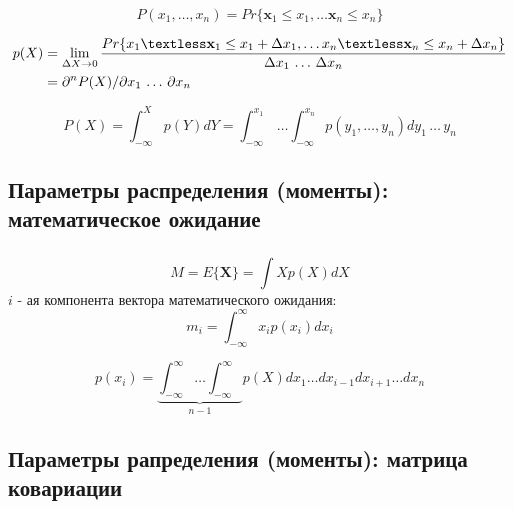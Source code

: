 \documentclass{beamer}
\begin{document}
\begin{frame}
  \frametitle{\insertsection}
  \framesubtitle{\insertsubsection}
  \begin{equation*}
   P(x_1, \ldots, x_n) = Pr\{\mathbf{x}_1 \le x_1, \ldots \mathbf{x}_n \le x_n \} 
  \end{equation*}
  
  \begin{align*}
    p(X) &=
    \lim_{\Delta X \rightarrow 0}
    \frac{
      Pr\{x_1 \textless \mathbf{x}_1 \le x_1 + \Delta x_1, \ldots x_n \textless \mathbf{x}_n \le x_n + \Delta x_n \}
    }
         {\Delta x_1 \, \ldots \, \Delta x_n} \\
         &= \partial^n P(X) / \partial x_1 \, \ldots \, \partial x_n
  \end{align*}
  
  \begin{equation*}
   P(X) = \int_{-\infty}^{X} p(Y) dY = \int_{-\infty}^{x_1} \, \ldots \int_{-\infty}^{x_n} p(y_1, \ldots, y_n) d y_1 \, \ldots \, y_n
  \end{equation*}


\end{frame}

\subsection{Параметры распределения (моменты): математическое ожидание}

\begin{frame}
  \frametitle{\insertsection}
  \framesubtitle{\insertsubsection}
  
  \begin{equation*}
    M = E\{ \mathbf{X} \} = \int X p(X) dX
  \end{equation*}
  $i$ - ая компонента вектора математического ожидания:
  \begin{equation*}
    m_i = \int_{-\infty}^{\infty} x_i p(x_i) dx_i
  \end{equation*}

  \begin{equation*}
    p(x_i) = \underbrace{\int_{-\infty}^{\infty} \ldots \int_{-\infty}^{\infty}}_{n - 1} p(X) dx_1 \ldots d x_{i - 1} d x_{i + 1} \ldots d x_n
  \end{equation*}

\end{frame}

\subsection{Параметры рапределения (моменты): матрица ковариации}
\end{document}
